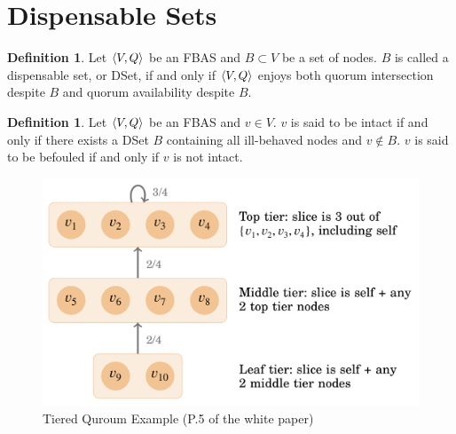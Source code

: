 \documentclass[12pt, psamsfonts]{amsart}
\theoremstyle{definition}
\newtheorem{defn}[thm]{Definition}
\theoremstyle{remark}
\numberwithin{equation}{section}
\begin{document}
\section{Dispensable Sets}

\begin{defn}\label{def_dset}
    Let $\ev{V, Q}$ be an FBAS and $B \subset V$ be a set of nodes.
    $B$ is called a dispensable set, or DSet, if and only if $\ev{V, Q}$ enjoys both quorum intersection despite $B$ and quorum availability despite $B$.
\end{defn}

\begin{defn}\label{def_intact_befouled}
    Let $\ev{V, Q}$ be an FBAS and $v \in V$.
    $v$ is said to be intact if and only if there exists a DSet $B$ containing all ill-behaved nodes and $v \notin B$.
    $v$ is said to be befouled if and only if $v$ is not intact.
\end{defn}

\begin{figure}[!htb]
    \includegraphics[width=.5\linewidth]{img/tiered_quorum_example.jpeg}
        \caption{Tiered Quroum Example (P.5 of the white paper)}
    \label{fig:tiered_quorum_example}
\end{figure}
\end{document}
